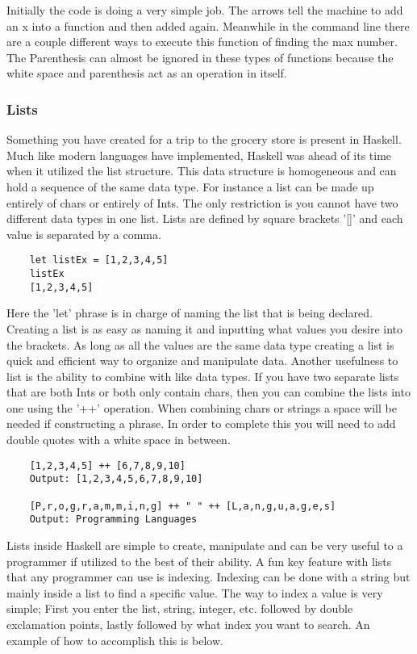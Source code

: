 \documentclass{article}
\begin{document}
    Initially the code is doing a very simple job. The arrows tell the machine to add an x into a function and then added again. Meanwhile in the command line there are a couple different ways to execute this function of finding the max number. The Parenthesis can almost be ignored in these types of functions because the white space and parenthesis act as an operation in itself.
    
    \subsubsection{Lists}
    Something you have created for a trip to the grocery store is present in Haskell. Much like modern languages have implemented, Haskell was ahead of its time when it utilized the list structure. This data structure is homogeneous and can hold a sequence of the same data type. For instance a list can be made up entirely of chars or entirely of Ints. The only restriction is you cannot have two different data types in one list. Lists are defined by square brackets '[]' and each value is separated by a comma. 
    
    \begin{lstlisting}
    let listEx = [1,2,3,4,5]
    listEx
    [1,2,3,4,5]
    \end{lstlisting}
    
    Here the 'let' phrase is in charge of naming the list that is being declared. Creating a list is as easy as naming it and inputting what values you desire into the brackets. As long as all the values are the same data type creating a list is quick and efficient way to organize and manipulate data. Another usefulness to list is the ability to combine with like data types. If you have two separate lists that are both Ints or both only contain chars, then you can combine the lists into one using the '++' operation. When combining chars or strings a space will be needed if constructing a phrase. In order to complete this you will need to add double quotes with a white space in between.
    
    \begin{lstlisting}
    [1,2,3,4,5] ++ [6,7,8,9,10]  
    Output: [1,2,3,4,5,6,7,8,9,10]
    
    [P,r,o,g,r,a,m,m,i,n,g] ++ " " ++ [L,a,n,g,u,a,g,e,s]
    Output: Programming Languages
    \end{lstlisting}
    
    Lists inside Haskell are simple to create, manipulate and can be very useful to a programmer if utilized to the best of their ability. A fun key feature with lists that any programmer can use is indexing. Indexing can be done with a string but mainly inside a list to find a specific value. The way to index a value is very simple; First you enter the list, string, integer, etc. followed by double exclamation points, lastly followed by what index you want to search. An example of how to accomplish this is below. 
    
\end{document}

